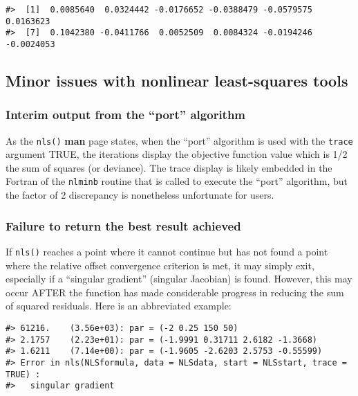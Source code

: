 \begin{verbatim}
#>  [1]  0.0085640  0.0324442 -0.0176652 -0.0388479 -0.0579575  0.0163623
#>  [7]  0.1042380 -0.0411766  0.0052509  0.0084324 -0.0194246 -0.0024053
\end{verbatim}

\hypertarget{minor-issues-with-nonlinear-least-squares-tools}{%
\subsection{Minor issues with nonlinear least-squares tools}\label{minor-issues-with-nonlinear-least-squares-tools}}

\hypertarget{interim-output-from-the-port-algorithm}{%
\subsubsection{Interim output from the ``port'' algorithm}\label{interim-output-from-the-port-algorithm}}

As the \texttt{nls()} \textbf{man} page states, when the ``port'' algorithm is used with the
\texttt{trace} argument TRUE, the iterations display the objective function value which
is 1/2 the sum of squares (or deviance). The trace display is likely
embedded in the Fortran of the \texttt{nlminb} routine that is called to execute
the ``port'' algorithm, but the factor of 2 discrepancy is nonetheless
unfortunate for users.

\hypertarget{failure-to-return-the-best-result-achieved}{%
\subsubsection{Failure to return the best result achieved}\label{failure-to-return-the-best-result-achieved}}

If \texttt{nls()} reaches a point where it cannot continue but has not found a point
where the relative offset convergence criterion is met, it may simply exit,
especially if a ``singular gradient'' (singular Jacobian) is found. However,
this may occur AFTER the function has made considerable progress in reducing
the sum of squared residuals.
Here is an abbreviated example:

\begin{verbatim}
#> 61216.    (3.56e+03): par = (-2 0.25 150 50)
#> 2.1757    (2.23e+01): par = (-1.9991 0.31711 2.6182 -1.3668)
#> 1.6211    (7.14e+00): par = (-1.9605 -2.6203 2.5753 -0.55599)
#> Error in nls(NLSformula, data = NLSdata, start = NLSstart, trace = TRUE) : 
#>   singular gradient
\end{verbatim}


